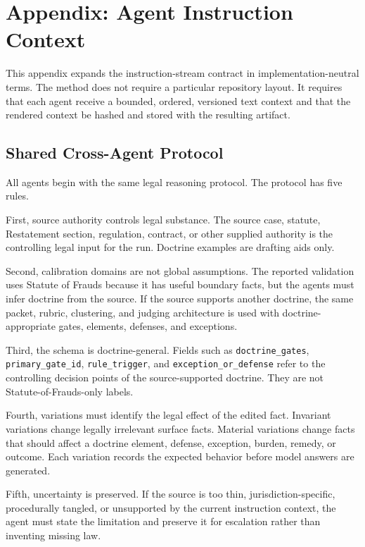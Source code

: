 \section{Appendix: Agent Instruction Context}
\label{app:instruction-context}

This appendix expands the instruction-stream contract in implementation-neutral
terms. The method does not require a particular repository layout. It requires
that each agent receive a bounded, ordered, versioned text context and that the
rendered context be hashed and stored with the resulting artifact.

\subsection{Shared Cross-Agent Protocol}

All agents begin with the same legal reasoning protocol. The protocol has five
rules.

First, source authority controls legal substance. The source case, statute,
Restatement section, regulation, contract, or other supplied authority is the
controlling legal input for the run. Doctrine examples are drafting aids only.

Second, calibration domains are not global assumptions. The reported validation
uses Statute of Frauds because it has useful boundary facts, but the agents must
infer doctrine from the source. If the source supports another doctrine, the same
packet, rubric, clustering, and judging architecture is used with
doctrine-appropriate gates, elements, defenses, and exceptions.

Third, the schema is doctrine-general. Fields such as
\texttt{doctrine\_gates}, \texttt{primary\_gate\_id},
\texttt{rule\_trigger}, and \texttt{exception\_or\_defense} refer to the
controlling decision points of the source-supported doctrine. They are not
Statute-of-Frauds-only labels.

Fourth, variations must identify the legal effect of the edited fact. Invariant
variations change legally irrelevant surface facts. Material variations change
facts that should affect a doctrine element, defense, exception, burden, remedy,
or outcome. Each variation records the expected behavior before model answers
are generated.

Fifth, uncertainty is preserved. If the source is too thin,
jurisdiction-specific, procedurally tangled, or unsupported by the current
instruction context, the agent must state the limitation and preserve it for
escalation rather than inventing missing law.

